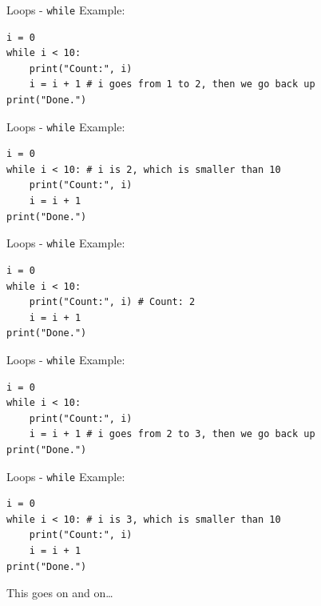 \documentclass[dvipsnames, svgnames, x11names, handout]{beamer}
\begin{document}
\addtocounter{framenumber}{-1}

\begin{frame}[fragile]{Loops - \texttt{while}}
Example:
\begin{verbatim}
i = 0
while i < 10: 
    print("Count:", i)
    i = i + 1 # i goes from 1 to 2, then we go back up
print("Done.")
\end{verbatim}
\end{frame}

\addtocounter{framenumber}{-1}

\begin{frame}[fragile]{Loops - \texttt{while}}
Example:
\begin{verbatim}
i = 0
while i < 10: # i is 2, which is smaller than 10
    print("Count:", i)
    i = i + 1
print("Done.")
\end{verbatim}
\end{frame}

\addtocounter{framenumber}{-1}

\begin{frame}[fragile]{Loops - \texttt{while}}
Example:
\begin{verbatim}
i = 0
while i < 10: 
    print("Count:", i) # Count: 2
    i = i + 1
print("Done.")
\end{verbatim}
\end{frame}

\addtocounter{framenumber}{-1}

\begin{frame}[fragile]{Loops - \texttt{while}}
Example:
\begin{verbatim}
i = 0
while i < 10: 
    print("Count:", i)
    i = i + 1 # i goes from 2 to 3, then we go back up
print("Done.")
\end{verbatim}
\end{frame}

\addtocounter{framenumber}{-1}

\begin{frame}[fragile]{Loops - \texttt{while}}
Example:
\begin{verbatim}
i = 0
while i < 10: # i is 3, which is smaller than 10
    print("Count:", i)
    i = i + 1
print("Done.")
\end{verbatim}

This goes on and on\dots
\end{frame}
\end{document}
